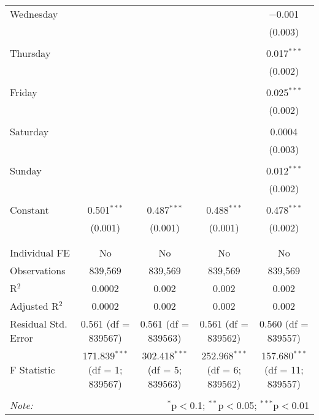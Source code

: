 \documentclass[
]{article}
\begin{document}
\begin{table}[!htbp]
{\begin{tabular}{@{\extracolsep{5pt}}lcccc}
 Wednesday &  &  &  & $-$0.001 \\ 
  &  &  &  & (0.003) \\ 
  & & & & \\ 
 Thursday &  &  &  & 0.017$^{***}$ \\ 
  &  &  &  & (0.002) \\ 
  & & & & \\ 
 Friday &  &  &  & 0.025$^{***}$ \\ 
  &  &  &  & (0.002) \\ 
  & & & & \\ 
 Saturday &  &  &  & 0.0004 \\ 
  &  &  &  & (0.003) \\ 
  & & & & \\ 
 Sunday &  &  &  & 0.012$^{***}$ \\ 
  &  &  &  & (0.002) \\ 
  & & & & \\ 
 Constant & 0.501$^{***}$ & 0.487$^{***}$ & 0.488$^{***}$ & 0.478$^{***}$ \\ 
  & (0.001) & (0.001) & (0.001) & (0.002) \\ 
  & & & & \\ 
\hline \\[-1.8ex] 
Individual FE & No & No & No & No \\ 
Observations & 839,569 & 839,569 & 839,569 & 839,569 \\ 
R$^{2}$ & 0.0002 & 0.002 & 0.002 & 0.002 \\ 
Adjusted R$^{2}$ & 0.0002 & 0.002 & 0.002 & 0.002 \\ 
Residual Std. Error & 0.561 (df = 839567) & 0.561 (df = 839563) & 0.561 (df = 839562) & 0.560 (df = 839557) \\ 
F Statistic & 171.839$^{***}$ (df = 1; 839567) & 302.418$^{***}$ (df = 5; 839563) & 252.968$^{***}$ (df = 6; 839562) & 157.680$^{***}$ (df = 11; 839557) \\ 
\hline 
\hline \\[-1.8ex] 
\textit{Note:}  & \multicolumn{4}{r}{$^{*}$p$<$0.1; $^{**}$p$<$0.05; $^{***}$p$<$0.01} \\ 
\end{tabular}
} 
\end{table} 
\newpage
\end{document}
